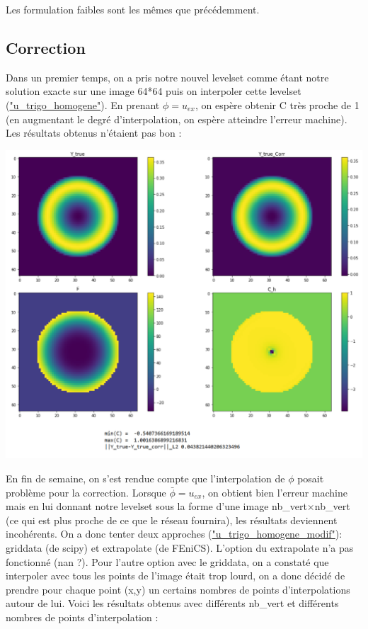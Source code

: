 Les formulation faibles sont les mêmes que précédemment.

\subsection{Correction}

Dans un premier temps, on a pris notre nouvel levelset comme étant notre solution exacte sur une image 64*64 puis on interpoler cette levelset (\href{https://colab.research.google.com/drive/15rw2vTlf8yNBIuQPsFHzguUj5fmJiLf9#scrollTo=N2Z4fEjTNpAV}{"u\_trigo\_homogene"}). En prenant $\phi=u_{ex}$, on espère obtenir C très proche de 1 (en augmentant le degré d'interpolation, on espère atteindre l'erreur machine). Les résultats obtenus n'étaient pas bon :

\begin{minipage}{\linewidth}
	\centering
	\includegraphics[width=0.45\linewidth]{resultats_correction.png}
\end{minipage}

\newpage 

En fin de semaine, on s'est rendue compte que l'interpolation de $\phi$ posait problème pour la correction. Lorsque $\bar{\phi}=u_{ex}$, on obtient bien l'erreur machine mais en lui donnant notre levelset sous la forme d'une image nb\_vert$\times$nb\_vert (ce qui est plus proche de ce que le réseau fournira), les résultats deviennent incohérents. On a donc tenter deux approches (\href{https://colab.research.google.com/drive/1JOC10OHCCNgTOCPD46bylKhlI1n1_bHR#scrollTo=0w0hQjVlLGwd}{"u\_trigo\_homogene\_modif"}): griddata (de scipy) et extrapolate (de FEniCS). L'option du extrapolate n'a pas fonctionné (nan ?). Pour l'autre option avec le griddata, on a constaté que interpoler avec tous les points de l'image était trop lourd, on a donc décidé de prendre pour chaque point (x,y) un certains nombres de points d'interpolations autour de lui. Voici les résultats obtenus avec différents nb\_vert et différents nombres de points d'interpolation :

